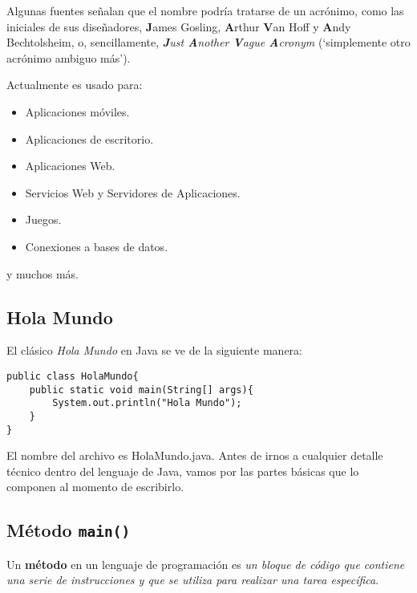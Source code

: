 \documentclass[12pt]{article}
\theoremstyle{largebreak}
\begin{document}
    \begin{obs}
        Algunas fuentes señalan que el nombre podría tratarse de un acrónimo, como las iniciales de sus diseñadores, \textbf{J}ames Gosling, \textbf{A}rthur \textbf{V}an Hoff y \textbf{A}ndy Bechtolsheim, o, sencillamente, \textit{\textbf{J}ust \textbf{A}nother \textbf{V}ague \textbf{A}cronym} (‘simplemente otro acrónimo ambiguo más’).
    \end{obs}

    Actualmente es usado para:
    \begin{itemize}
        \item Aplicaciones móviles.
        \item Aplicaciones de escritorio.
        \item Aplicaciones Web.
        \item Servicios Web y Servidores de Aplicaciones.
        \item Juegos.
        \item Conexiones a bases de datos.
    \end{itemize}
    y muchos más.
    
    \subsection{Hola Mundo}

    El clásico \textit{Hola Mundo} en Java se ve de la siguiente manera:

    \begin{lstlisting}[caption={Hola Mundo.},label=DescriptiveLabel]
public class HolaMundo{
    public static void main(String[] args){
        System.out.println("Hola Mundo");
    }
}
    \end{lstlisting}

    El nombre del archivo es HolaMundo.java. Antes de irnos a cualquier detalle técnico dentro del lenguaje de Java, vamos por las partes básicas que lo componen al momento de escribirlo.

    \subsection{Método \lstinline|main()|}

    \begin{mydef}
        Un \textbf{método} en un lenguaje de programación es \textit{un bloque de código que contiene una serie de instrucciones y que se utiliza para realizar una tarea específica}.
    \end{mydef}
\end{document}
